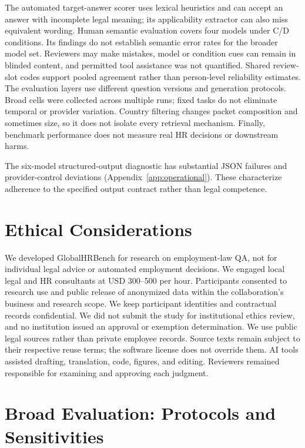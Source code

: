 \documentclass[11pt]{article}
\DeclareRobustCommand{\claim}[2]{#2}
\begin{document}
\claim{LIMITATIONS}{The automated target-answer scorer uses lexical heuristics and can accept an answer with incomplete legal meaning; its applicability extractor can also miss equivalent wording. Human semantic evaluation covers four models under C/D conditions. Its findings do not establish semantic error rates for the broader model set. Reviewers may make mistakes, model or condition cues can remain in blinded content, and permitted tool assistance was not quantified. Shared review-slot codes support pooled agreement rather than person-level reliability estimates. The evaluation layers use different question versions and generation protocols. Broad cells were collected across multiple runs; fixed tasks do not eliminate temporal or provider variation. Country filtering changes packet composition and sometimes size, so it does not isolate every retrieval mechanism. Finally, benchmark performance does not measure real HR decisions or downstream harms.}

\claim{LIMITATIONS}{The six-model structured-output diagnostic has substantial JSON failures and provider-control deviations (Appendix~\ref{app:operational}). These characterize adherence to the specified output contract rather than legal competence.}

\section*{Ethical Considerations}
\claim{ETHICS}{We developed GlobalHRBench for research on employment-law QA, not for individual legal advice or automated employment decisions. We engaged local legal and HR consultants at USD 300--500 per hour. Participants consented to research use and public release of anonymized data within the collaboration's business and research scope. We keep participant identities and contractual records confidential. We did not submit the study for institutional ethics review, and no institution issued an approval or exemption determination. We use public legal sources rather than private employee records. Source texts remain subject to their respective reuse terms; the software license does not override them. AI tools assisted drafting, translation, code, figures, and editing. Reviewers remained responsible for examining and approving each judgment.}


\clearpage
\appendix
\section{Broad Evaluation: Protocols and Sensitivities}
\label{app:arr-details}
\end{document}
